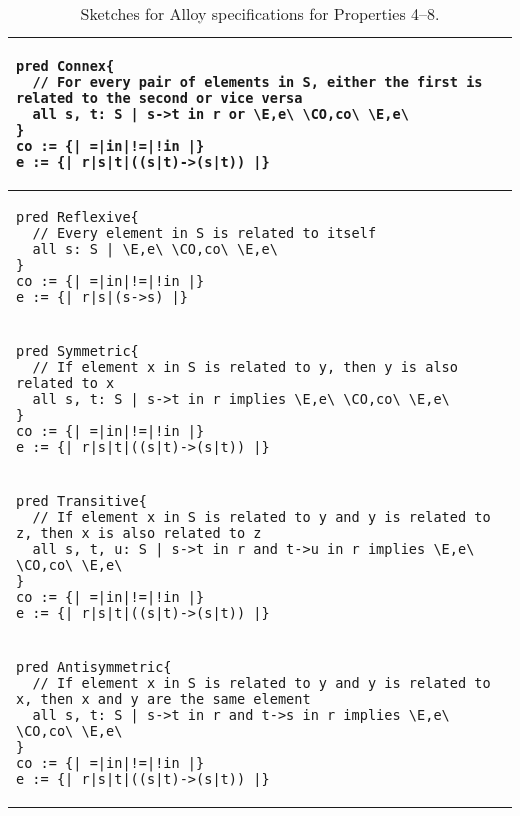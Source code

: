 \begin{table}[!h]
\centering
\begin{tabular}{p{12cm}}
\hline
\begin{lstlisting}[style=AlloyTable]
pred Connex{
  // For every pair of elements in S, either the first is related to the second or vice versa
  all s, t: S | s->t in r or \E,e\ \CO,co\ \E,e\
}
co := {| =|in|!=|!in |}
e := {| r|s|t|((s|t)->(s|t)) |}
\end{lstlisting} \\ \hline

\begin{lstlisting}[style=AlloyTable]
pred Reflexive{
  // Every element in S is related to itself
  all s: S | \E,e\ \CO,co\ \E,e\
}
co := {| =|in|!=|!in |}
e := {| r|s|(s->s) |}
\end{lstlisting} \\ \hline

\begin{lstlisting}[style=AlloyTable]
pred Symmetric{
  // If element x in S is related to y, then y is also related to x
  all s, t: S | s->t in r implies \E,e\ \CO,co\ \E,e\
}
co := {| =|in|!=|!in |}
e := {| r|s|t|((s|t)->(s|t)) |}
\end{lstlisting} \\ \hline

\begin{lstlisting}[style=AlloyTable]
pred Transitive{
  // If element x in S is related to y and y is related to z, then x is also related to z
  all s, t, u: S | s->t in r and t->u in r implies \E,e\ \CO,co\ \E,e\
}
co := {| =|in|!=|!in |}
e := {| r|s|t|((s|t)->(s|t)) |}
\end{lstlisting} \\ \hline

\begin{lstlisting}[style=AlloyTable]
pred Antisymmetric{
  // If element x in S is related to y and y is related to x, then x and y are the same element
  all s, t: S | s->t in r and t->s in r implies \E,e\ \CO,co\ \E,e\
}
co := {| =|in|!=|!in |}
e := {| r|s|t|((s|t)->(s|t)) |}
\end{lstlisting} \\ \hline

\end{tabular}
\vspace*{2ex}
\caption{Sketches for Alloy specifications for Properties 4--8.}
\vspace*{-8ex}
\label{tab:sketches-4-8}
\end{table}


